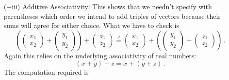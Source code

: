 {\begin{enumerate}
This again relies on the underlying real numbers which for any $x,y\in {\mathbb R}$ obey 
\[x+y=y+x\, .\]
This fact underlies the middle step of the following computation
\[
\begin{pmatrix}x_1\\x_2\end{pmatrix}+
\begin{pmatrix}y_1\\y_2\end{pmatrix}
=
\begin{pmatrix}x_1+y_1\\x_2+y_2\end{pmatrix}
=
\begin{pmatrix}y_1+x_1\\y_2+x_2\end{pmatrix}
=
\begin{pmatrix}y_1\\y_2\end{pmatrix}+
\begin{pmatrix}x_1\\x_2\end{pmatrix}\, ,\]
which demonstrates what we wished to show.
\item[(+iii)] Additive Associativity:
This shows that we needn't specify with parentheses which 
order we intend to add triples of vectors because their sums 
will agree for either choice. What we have to check is
\[
\left(\begin{pmatrix}x_1\\x_2\end{pmatrix}+
\begin{pmatrix}y_1\\y_2\end{pmatrix}\right)+
\begin{pmatrix}z_1\\z_2\end{pmatrix}
\stackrel?=
\begin{pmatrix}x_1\\x_2\end{pmatrix}+
\left(\begin{pmatrix}y_1\\y_2\end{pmatrix}+
\begin{pmatrix}z_1\\z_2\end{pmatrix}\right)\, .\]
Again this relies on the underlying associativity of real numbers:
\[
(x+y)+z=x+(y+z)\, .
\]
The computation required is
\begin{gather*}

\end{gather*}
\end{enumerate}}
